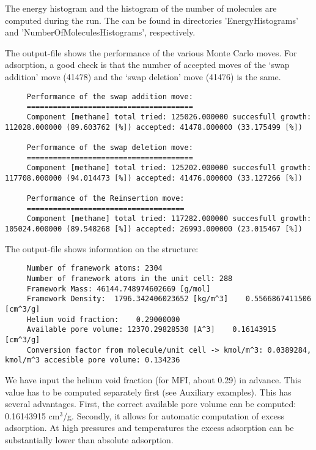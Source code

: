 \noindent
The energy histogram and the histogram of the number of molecules are computed during the run.
The can be found in directories 'EnergyHistograms' and 'NumberOfMoleculesHistograms', respectively.

\noindent
The output-file shows the performance of the various Monte Carlo moves. For adsorption, a good check is that the number of accepted moves
of the `swap addition' move (41478) and the `swap deletion' move (41476) is the same.
\begin{tiny}
\begin{verbatim}
     Performance of the swap addition move:
     ======================================
     Component [methane] total tried: 125026.000000 succesfull growth: 112028.000000 (89.603762 [%]) accepted: 41478.000000 (33.175499 [%])

     Performance of the swap deletion move:
     ======================================
     Component [methane] total tried: 125202.000000 succesfull growth: 117708.000000 (94.014473 [%]) accepted: 41476.000000 (33.127266 [%])

     Performance of the Reinsertion move:
     ====================================
     Component [methane] total tried: 117282.000000 succesfull growth: 105024.000000 (89.548268 [%]) accepted: 26993.000000 (23.015467 [%])
\end{verbatim}
\end{tiny}

The output-file shows information on the structure:
\begin{tiny}
\begin{verbatim}
     Number of framework atoms: 2304
     Number of framework atoms in the unit cell: 288
     Framework Mass: 46144.748974602669 [g/mol]
     Framework Density:  1796.342406023652 [kg/m^3]    0.5566867411506 [cm^3/g]
     Helium void fraction:    0.29000000
     Available pore volume: 12370.29828530 [A^3]    0.16143915 [cm^3/g]
     Conversion factor from molecule/unit cell -> kmol/m^3: 0.0389284, kmol/m^3 accesible pore volume: 0.134236
\end{verbatim}
\end{tiny}
We have input the helium void fraction (for MFI, about 0.29) in advance.
This value has to be computed separately first (see Auxiliary examples).
This has several advantages. First, the correct available
pore volume can be computed: 0.16143915 cm$^3$/g. Secondly, it allows for automatic computation of excess adsorption.
At high pressures and temperatures the excess adsorption can be substantially lower than absolute adsorption.

